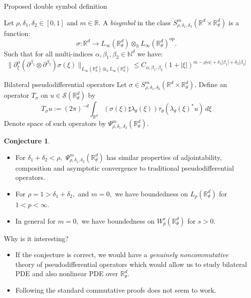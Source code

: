 \documentclass{beamer}
\numberwithin{equation}{section}
\theoremstyle{plain}
\theoremstyle{plain}
\theoremstyle{definition}
\theoremstyle{plain}
\theoremstyle{plain}
\theoremstyle{definition}
\newtheorem{conjecture}{Conjecture}
\newcommand{\Rl}{\mathbb{R}}
\newcommand{\Ntrl}{\mathbb{N}}
\newcommand{\Sc}{\mathcal{S}}
\newcommand{\dmult}{\sharp}
\newcommand{\op}{\mathrm{op}}
\begin{document}
\begin{frame}{Proposed double symbol definition}
\begin{definition}
    Let $\rho,\delta_1,\delta_2 \in [0,1]$ and $m \in \Rl$. A \emph{bisymbol} in the class $S^m_{\rho,\delta_1,\delta_2}(\Rl^d\times \Rl^d_\theta)$
    is a function:
    \begin{equation*}
        \sigma:\Rl^d\to L_\infty(\Rl^d_\theta)\otimes_h L_\infty(\Rl^d_\theta)^\op.
    \end{equation*}
    Such that for all multi-indices $\alpha,\beta_1,\beta_2\in \Ntrl^d$ we have:
    \begin{equation*}
        \|\partial_\xi^\alpha (\partial^{\beta_1}\otimes \partial^{\beta_2})\sigma(\xi)\|_{L_\infty(\Rl^d_\theta)\otimes_h L_\infty(\Rl^d_\theta)} \leq C_{\alpha,\beta_1,\beta_2}(1+|\xi|)^{m-\rho|\alpha|+\delta_1|\beta_1|+\delta_2|\beta_2|}
    \end{equation*}
\end{definition}
\end{frame}

\begin{frame}{Bilateral pseudodifferential operators}
Let $\sigma\in S^m_{\rho,\delta_1,\delta_2}(\Rl^d\times \Rl^d_\theta).$ Define an operator $T_{\sigma}$ on $u\in \Sc(\Rl^d_\theta)$ by
\begin{equation*}
    T_\sigma u := (2\pi)^{-d}\int_{\Rl^d} (\sigma(\xi)\dmult \lambda_\theta(\xi))\tau_\theta(\lambda_\theta(\xi)^*u)\,d\xi
\end{equation*}
Denote space of such operators by $\Psi^{m}_{\rho,\delta_1,\delta_2}(\Rl^d_\theta).$
\pause
\begin{conjecture}
\begin{itemize}
    \item{} For $\delta_1+\delta_2<\rho,$ $\Psi^m_{\rho,\delta_1,\delta_2}(\Rl^d_\theta)$ has similar properties of adjointability, composition and asymptotic convergence to traditional pseudodifferential operators. \pause
    \item{} For $\rho=1>\delta_1+\delta_2,$ and $m=0,$ we have boundedness on $L_p(\Rl^d_\theta)$ for $1<p<\infty.$
    \item{} In general for $m=0,$ we have boundedness on $W^s_p(\Rl^d_\theta)$ for $s>0.$
\end{itemize}
\end{conjecture}
\end{frame}

\begin{frame}{Why is it interesting?}
\begin{itemize}
    \item{} If the conjecture is correct, we would have a \emph{genuinely noncommutative} theory of pseudodifferential operators which would allow us to study bilateral PDE and also nonlinear PDE
    over $\Rl^d_\theta.$
    \item{} Following the standard commutative proofs does not seem to work.
\end{itemize}
\end{frame}
\end{document}
